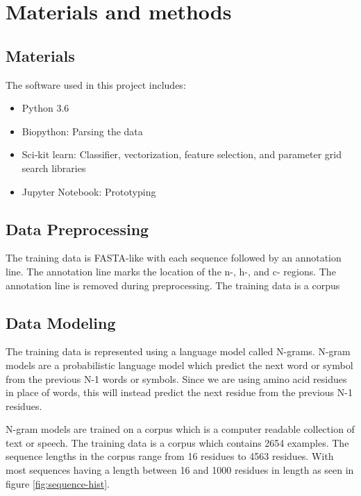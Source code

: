 \documentclass[10pt,letterpaper]{article}
\begin{document}
	\section*{Materials and methods}
	\subsection*{Materials}
	The software used in this project includes:
	\begin{itemize}
		\item{Python 3.6}
		\item{Biopython: Parsing the data}
		\item{Sci-kit learn: Classifier, vectorization, feature selection, and parameter grid search libraries}
		\item{Jupyter Notebook: Prototyping}
	\end{itemize}
	\subsection*{Data Preprocessing}
	The training data is FASTA-like with each sequence followed by an annotation line.  The annotation line marks the location of the n-, h-, and c- regions. The annotation line is removed during preprocessing. The training data is a corpus
	
	\subsection*{Data Modeling}
	The training data is represented using a language model called N-grams. N-gram models are a probabilistic language model which predict the next word or symbol from the previous N-1 words or symbols. Since we are using amino acid residues in place of words, this will instead predict the next residue from the previous N-1 residues. 

	N-gram models are trained on a corpus which is a computer readable collection of text or speech\cite{jurafsky}. The training data is a corpus which contains 2654 examples. The sequence lengths in the corpus range from 16 residues to 4563 residues. With most sequences having a length between 16 and 1000 residues in length as seen in figure \ref{fig:sequence-hist}. 
	
\end{document}
